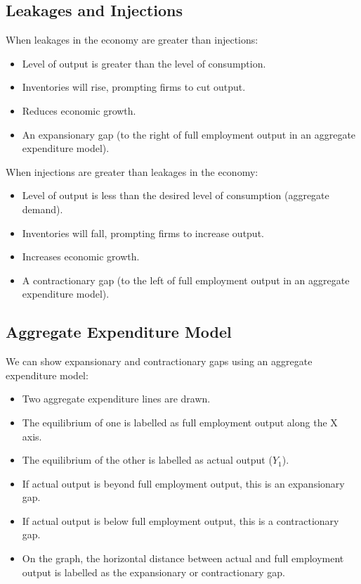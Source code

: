 \documentclass[a4paper,11pt]{report}
\begin{document}
\subsection{Leakages and Injections}

When leakages in the economy are greater than injections:

\begin{itemize}
\item Level of output is greater than the level of consumption.
\item Inventories will rise, prompting firms to cut output.
\item Reduces economic growth.
\item An expansionary gap (to the right of full employment output in an
	aggregate expenditure model).
\end{itemize}

When injections are greater than leakages in the economy:

\begin{itemize}
\item Level of output is less than the desired level of consumption (aggregate
	demand).
\item Inventories will fall, prompting firms to increase output.
\item Increases economic growth.
\item A contractionary gap (to the left of full employment output in an
	aggregate expenditure model).
\end{itemize}

\subsection{Aggregate Expenditure Model}


We can show expansionary and contractionary gaps using an aggregate expenditure
model:

\begin{itemize}
\item Two aggregate expenditure lines are drawn.
\item The equilibrium of one is labelled as full employment output along the X
	axis.
\item The equilibrium of the other is labelled as actual output ($Y_1$).
\item If actual output is beyond full employment output, this is an expansionary
	gap.
\item If actual output is below full employment output, this is a contractionary
	gap.
\item On the graph, the horizontal distance between actual and full employment
	output is labelled as the expansionary or contractionary gap.
\end{itemize}
\end{document}
